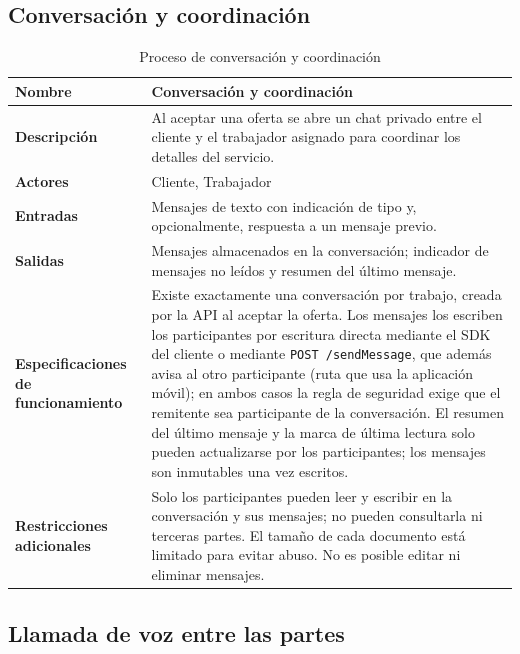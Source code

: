 \documentclass[doc,12pt,a4paper]{apa7}
\begin{document}
\subsection{Conversación y coordinación}

\begin{longtable}{|P{3.3cm}|L{11.2cm}|}
\caption{Proceso de conversación y coordinación}\\
\hline
\textbf{Nombre} & Conversación y coordinación \\ \hline
\textbf{Descripción} & Al aceptar una oferta se abre un chat privado entre el cliente y el trabajador asignado para coordinar los detalles del servicio. \\ \hline
\textbf{Actores} & Cliente, Trabajador \\ \hline
\textbf{Entradas} & Mensajes de texto con indicación de tipo y, opcionalmente, respuesta a un mensaje previo. \\ \hline
\textbf{Salidas} & Mensajes almacenados en la conversación; indicador de mensajes no leídos y resumen del último mensaje. \\ \hline
\textbf{Especificaciones de funcionamiento} & Existe exactamente una conversación por trabajo, creada por la API al aceptar la oferta. Los mensajes los escriben los participantes por escritura directa mediante el SDK del cliente o mediante \texttt{POST /sendMessage}, que además avisa al otro participante (ruta que usa la aplicación móvil); en ambos casos la regla de seguridad exige que el remitente sea participante de la conversación. El resumen del último mensaje y la marca de última lectura solo pueden actualizarse por los participantes; los mensajes son inmutables una vez escritos. \\ \hline
\textbf{Restricciones adicionales} & Solo los participantes pueden leer y escribir en la conversación y sus mensajes; no pueden consultarla ni terceras partes. El tamaño de cada documento está limitado para evitar abuso. No es posible editar ni eliminar mensajes. \\ \hline
\end{longtable}

\subsection{Llamada de voz entre las partes}
\end{document}
